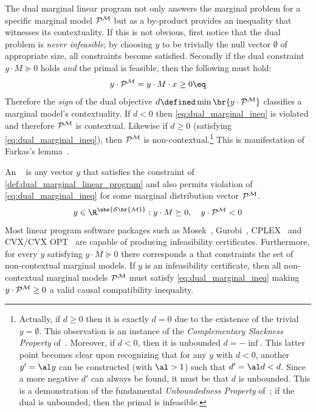 \documentclass[aps, 10pt, english, twoside, pra, nofootinbib, tightenlines, longbibliography]{revtex4-1}
\renewcommand{\Events}[1]{\mathcal{S}\br{#1}} %
\begin{document}
    The dual marginal linear program not only answers the marginal problem for a specific marginal model $\probvec^{\mscenario}$ but as a by-product provides an inequality that witnesses its contextuality. If this is not obvious, first notice that the dual problem is \textit{never infeasible}; by choosing $y$ to be trivially the null vector $\emptyset$ of appropriate size, all constraints become satisfied. Secondly if the dual constraint $y \cdot M \succeq 0$ holds \textit{and} the primal is feasible, then the following must hold:
    \[ y \cdot \probvec^{\mscenario} =  y \cdot M \cdot x \geq 0 \eq \label{eq:dual_marginal_ineq} \]
    Therefore the \textit{sign} of the dual objective $d \defined \min \br{y \cdot \probvec^{\mscenario}}$ classifies a marginal model's contextuality. If $d < 0$ then \cref{eq:dual_marginal_ineq} is violated and therefore $\probvec^{\mscenario}$ is contextual. Likewise if $d \geq 0$ (satisfying \cref{eq:dual_marginal_ineq}), then $\probvec^{\mscenario}$ is non-contextual.\footnote{Actually, if $d \geq 0$ then it is exactly $d = 0$ due to the existence of the trivial $y = \emptyset$. This observation is an instance of the \textit{Complementary Slackness Property} of~\cite{Bradley_1977}. Moreover, if $d < 0$, then it is unbounded $d = -\inf$. This latter point becomes clear upon recognizing that for any $y$ with $d < 0$, another $y' = \al y$ can be constructed (with $\al > 1$) such that $d' = \al d < d$. Since a more negative $d'$ can always be found, it must be that $d$ is unbounded. This is a demonstration of the fundamental \textit{Unboundedness Property} of~\cite{Bradley_1977}; if the dual is unbounded, then the primal is infeasible.} This is manifestation of Farkas's lemma~\cite{Schrijver_1998}.

    An ~\cite{Andersen_2001} is any vector $y$ that satisfies the constraint of \cref{def:dual_marginal_linear_program} and also permits violation of \cref{eq:dual_marginal_ineq} for some marginal distribution vector $\probvec^{\mscenario}$.
    \[ y \in \R^{\abs{\Events{\mscenario}}} : y \cdot M \succeq 0, \quad y \cdot \probvec^{\mscenario} < 0 \]
    Most linear program software packages such as Mosek~\cite{Mosek_2016}, Gurobi~\cite{Gurobi_2016}, CPLEX~\cite{Cplex_2016} and CVX/CVX OPT~\cite{CVX_2016,CVX_Opt_2016} are capable of producing infeasibility certificates.
    Furthermore, for every $y$ satisfying $y \cdot M \succeq 0$ there corresponds a  that constraints the set of non-contextual marginal models. If $y$ is an infeasibility certificate, then all non-contextual marginal models $\probvec^{\mscenario}$ must satisfy \cref{eq:dual_marginal_ineq} making $y \cdot \probvec^{\mscenario} \geq 0$ a valid causal compatibility inequality.
\end{document}
